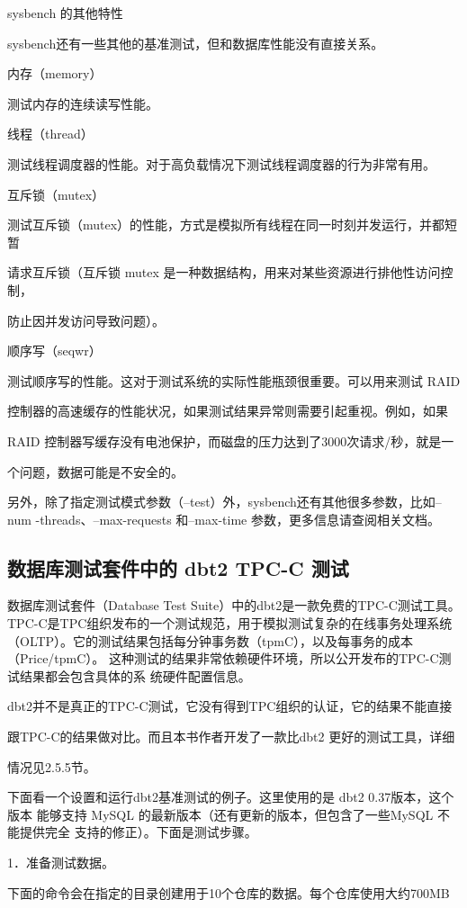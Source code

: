 sysbench 的其他特性

sysbench还有一些其他的基准测试，但和数据库性能没有直接关系。

内存（memory）

测试内存的连续读写性能。

线程（thread）

测试线程调度器的性能。对于高负载情况下测试线程调度器的行为非常有用。

互斥锁（mutex）

测试互斥锁（mutex）的性能，方式是模拟所有线程在同一时刻并发运行，并都短暂

请求互斥锁（互斥锁 mutex 是一种数据结构，用来对某些资源进行排他性访问控制，

防止因并发访问导致问题）。

顺序写（seqwr）

测试顺序写的性能。这对于测试系统的实际性能瓶颈很重要。可以用来测试 RAID

控制器的高速缓存的性能状况，如果测试结果异常则需要引起重视。例如，如果

RAID 控制器写缓存没有电池保护，而磁盘的压力达到了3000次请求/秒，就是一

个问题，数据可能是不安全的。

另外，除了指定测试模式参数（--test）外，sysbench还有其他很多参数，比如--num
-threads、--max-requests 和--max-time 参数，更多信息请查阅相关文档。

\subsection{数据库测试套件中的 dbt2 TPC-C 测试}
数据库测试套件（Database Test Suite）中的dbt2是一款免费的TPC-C测试工具。
TPC-C是TPC组织发布的一个测试规范，用于模拟测试复杂的在线事务处理系统
（OLTP）。它的测试结果包括每分钟事务数（tpmC），以及每事务的成本（Price/tpmC）。
这种测试的结果非常依赖硬件环境，所以公开发布的TPC-C测试结果都会包含具体的系
统硬件配置信息。

dbt2并不是真正的TPC-C测试，它没有得到TPC组织的认证，它的结果不能直接

跟TPC-C的结果做对比。而且本书作者开发了一款比dbt2 更好的测试工具，详细

情况见2.5.5节。

下面看一个设置和运行dbt2基准测试的例子。这里使用的是 dbt2 0.37版本，这个版本
能够支持 MySQL 的最新版本（还有更新的版本，但包含了一些MySQL 不能提供完全
支持的修正）。下面是测试步骤。

1．准备测试数据。

下面的命令会在指定的目录创建用于10个仓库的数据。每个仓库使用大约700MB

